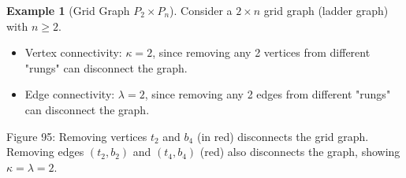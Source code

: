 \documentclass{article}
\theoremstyle{definition}
\newtheorem{example}{Example}
\begin{document}
\begin{example}[Grid Graph $P_2 \times P_n$]
Consider a $2 \times n$ grid graph (ladder graph) with $n \geq 2$.
\begin{itemize}
  \item Vertex connectivity: $\kappa = 2$, since removing any 2 vertices from different "rungs" can disconnect the graph.
  \item Edge connectivity: $\lambda = 2$, since removing any 2 edges from different "rungs" can disconnect the graph.
\end{itemize}
\begin{center}

\small Figure 95: Removing vertices $t_2$ and $b_4$ (in red) disconnects the grid graph. Removing edges $(t_2,b_2)$ and $(t_4,b_4)$ (red) also disconnects the graph, showing $\kappa = \lambda = 2$.
\end{center}
\end{example}
\end{document}
